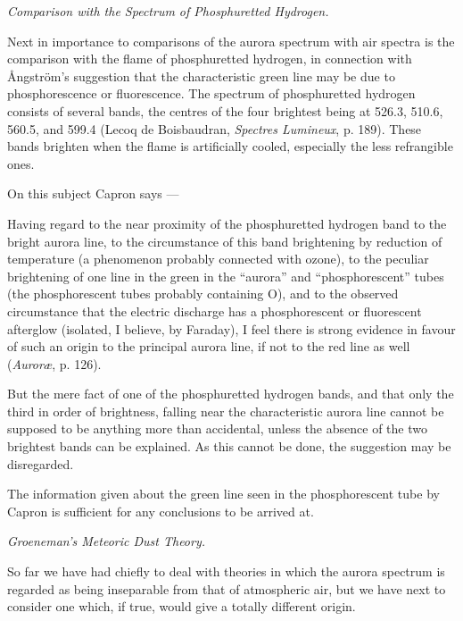 \documentclass[a4paper, 12pt, oneside, polutonikogreek, english]{article}
\begin{document}
\emph{Comparison with the Spectrum of Phosphuretted Hydrogen.}

Next in importance to comparisons of the aurora spectrum with air spectra is the comparison with the flame of phosphuretted hydrogen, in connection with Ångström's suggestion that the characteristic green line may be due to phosphorescence or fluorescence. The spectrum of phosphuretted hydrogen consists of several bands, the centres of the four brightest being at 526.3, 510.6, 560.5, and 599.4 (Lecoq de Boisbaudran, \emph{Spectres Lumineux}, p. 189). These bands brighten when the flame is artificially cooled, especially the less refrangible ones.

On this subject Capron says ---

Having regard to the near proximity of the phosphuretted hydrogen band to the bright aurora line, to the circumstance of this band brightening by reduction of temperature (a phenomenon probably connected with ozone), to the peculiar brightening of one line in the green in the ``aurora'' and ``phosphorescent'' tubes (the phosphorescent tubes probably containing O), and to the observed circumstance that the electric discharge has a phosphorescent or fluorescent afterglow (isolated, I believe, by Faraday), I feel there is strong evidence in favour of such an origin to the principal aurora line, if not to the red line as well (\emph{Auroræ}, p. 126).

But the mere fact of one of the phosphuretted hydrogen bands, and that only the third in order of brightness, falling near the characteristic aurora line cannot be supposed to be anything more than accidental, unless the absence of the two brightest bands can be explained. As this cannot be done, the suggestion may be disregarded.

The information given about the green line seen in the phosphorescent tube by Capron is sufficient for any conclusions to be arrived at.

\emph{Groeneman's Meteoric Dust Theory.}

So far we have had chiefly to deal with theories in which the aurora spectrum is regarded as being inseparable from that of atmospheric air, but we have next to consider one which, if true, would give a totally different origin.
\end{document}
